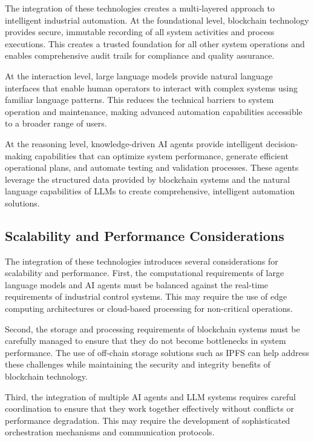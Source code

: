 The integration of these technologies creates a multi-layered approach to intelligent industrial automation. At the foundational level, blockchain technology provides secure, immutable recording of all system activities and process executions. This creates a trusted foundation for all other system operations and enables comprehensive audit trails for compliance and quality assurance.

At the interaction level, large language models provide natural language interfaces that enable human operators to interact with complex systems using familiar language patterns. This reduces the technical barriers to system operation and maintenance, making advanced automation capabilities accessible to a broader range of users.

At the reasoning level, knowledge-driven AI agents provide intelligent decision-making capabilities that can optimize system performance, generate efficient operational plans, and automate testing and validation processes. These agents leverage the structured data provided by blockchain systems and the natural language capabilities of LLMs to create comprehensive, intelligent automation solutions.

\subsection{Scalability and Performance Considerations}

The integration of these technologies introduces several considerations for scalability and performance. First, the computational requirements of large language models and AI agents must be balanced against the real-time requirements of industrial control systems. This may require the use of edge computing architectures or cloud-based processing for non-critical operations.

Second, the storage and processing requirements of blockchain systems must be carefully managed to ensure that they do not become bottlenecks in system performance. The use of off-chain storage solutions such as IPFS can help address these challenges while maintaining the security and integrity benefits of blockchain technology.

Third, the integration of multiple AI agents and LLM systems requires careful coordination to ensure that they work together effectively without conflicts or performance degradation. This may require the development of sophisticated orchestration mechanisms and communication protocols.

